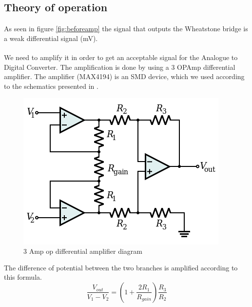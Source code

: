 \documentclass{article}[12pt]
\begin{document}
\subsection{Theory of operation}
\paragraph{}
As seen in figure \ref{fig:beforeamp} the signal that outputs the Wheatstone bridge is a weak differential signal (mV).
\paragraph{}
We need to amplify it in order to get an acceptable signal for the Analogue to Digital Converter.
The amplification is done by using a 3 OPAmp differential amplifier. The amplifier (MAX4194) is an SMD device, which we used according to the schematics presented in \cite{MaximIntegrated-2015}.
\begin{figure}[H]
    \centering
    \includegraphics[width = .4\textwidth]{figures/3AOP_differential_amplifier.png}
    \caption{3 Amp op differential amplifier diagram}
    \label{fig:3OpAmp}
\end{figure}
The difference of potential between the two branches is amplified according to this formula.
\begin{equation}
    \dfrac{V_{out}}{V_1-V_2}=(1+\dfrac{2R_1}{R_{gain}})\dfrac{R_3}{R_2}
\end{equation}
\end{document}
